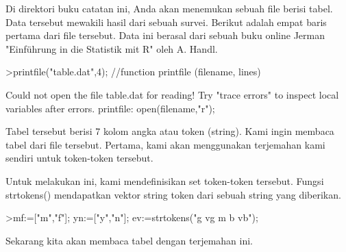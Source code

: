 \documentclass[12pt,arial,letterpaper]{book}
\begin{document}
\begin{eulercomment}
\begin{eulercomment}
\begin{eulercomment}
\begin{eulercomment}
\begin{eulercomment}
\begin{eulercomment}
\begin{eulercomment}
\begin{eulercomment}
\begin{eulercomment}
\begin{eulercomment}
\begin{eulercomment}
\begin{eulercomment}
\begin{eulercomment}
\begin{eulercomment}
\begin{eulercomment}
\begin{eulercomment}
\begin{eulercomment}
\begin{eulercomment}
\begin{eulercomment}
\begin{eulercomment}
\begin{eulercomment}
\begin{eulercomment}
\begin{eulercomment}
\begin{eulercomment}
\begin{eulercomment}
\begin{eulercomment}
\begin{eulercomment}
\begin{eulercomment}
\begin{eulercomment}
\begin{eulercomment}
\begin{eulercomment}
\begin{eulercomment}
\begin{eulercomment}
Di direktori buku catatan ini, Anda akan menemukan sebuah file berisi
tabel. Data tersebut mewakili hasil dari sebuah survei. Berikut adalah
empat baris pertama dari file tersebut. Data ini berasal dari sebuah
buku online Jerman "Einführung in die Statistik mit R" oleh A. Handl.
\end{eulercomment}
\begin{eulerprompt}
>printfile("table.dat",4); //function printfile (filename, lines)
\end{eulerprompt}
\begin{euleroutput}
  Could not open the file
  table.dat
  for reading!
  Try "trace errors" to inspect local variables after errors.
  printfile:
      open(filename,"r");
\end{euleroutput}
\begin{eulercomment}
Tabel tersebut berisi 7 kolom angka atau token (string). Kami ingin
membaca tabel dari file tersebut. Pertama, kami akan menggunakan
terjemahan kami sendiri untuk token-token tersebut.

Untuk melakukan ini, kami mendefinisikan set token-token tersebut.
Fungsi strtokens() mendapatkan vektor string token dari sebuah string
yang diberikan.
\end{eulercomment}
\begin{eulerprompt}
>mf:=["m","f"]; yn:=["y","n"]; ev:=strtokens("g vg m b vb");
\end{eulerprompt}
\begin{eulercomment}
Sekarang kita akan membaca tabel dengan terjemahan ini.


\end{eulercomment}
\end{eulercomment}
\end{eulercomment}
\end{eulercomment}
\end{eulercomment}
\end{eulercomment}
\end{eulercomment}
\end{eulercomment}
\end{eulercomment}
\end{eulercomment}
\end{eulercomment}
\end{eulercomment}
\end{eulercomment}
\end{eulercomment}
\end{eulercomment}
\end{eulercomment}
\end{eulercomment}
\end{eulercomment}
\end{eulercomment}
\end{eulercomment}
\end{eulercomment}
\end{eulercomment}
\end{eulercomment}
\end{eulercomment}
\end{eulercomment}
\end{eulercomment}
\end{eulercomment}
\end{eulercomment}
\end{eulercomment}
\end{eulercomment}
\end{eulercomment}
\end{eulercomment}
\end{eulercomment}
\end{document}
